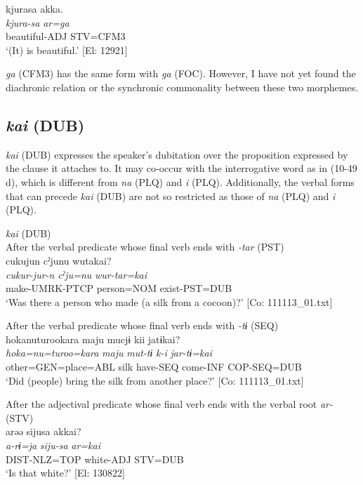 \begin{xlist}
  \ex  %
      \glll    kjurasa  akka.\\
      \textit{kjura-sa}  \textit{ar=ga}\\
      beautiful-ADJ  STV=CFM3\\
      \glt       ‘(It) is beautiful.’ [El: 12921]
    \z
\z

  \textit{ga} (CFM3) has the same form with \textit{ga} (FOC). However, I have not yet found the diachronic relation or the synchronic commonality between these two morphemes.

\subsection{\textit{kai} (DUB)}\label{sec:10.3.6}

\textit{kai} (DUB) expresses the speaker’s dubitation over the proposition expressed by the clause it attaches to. It may co-occur with the interrogative word as in (10-49 d), which is different from \textit{na} (PLQ) and \textit{i} (PLQ). Additionally, the verbal forms that can precede \textit{kai} (DUB) are not so restricted as those of \textit{na} (PLQ) and \textit{i} (PLQ).

\ea\label{ex:10.49}   \textit{kai} (DUB)\\
  \ea After the verbal predicate whose final verb ends with \textit{{}-tar} (PST)\\
      \glll    cukujun  cˀjunu  wutakai?\\
    \textit{cukur-jur-n}  \textit{cˀju=nu}  \textit{wur-tar=kai}\\
    make-UMRK-PTCP  person=NOM  exist-PST=DUB\\
\glt     ‘Was there a person who made (a silk from a cocoon)?’  [Co: 111113\_01.txt]

  \ex After the verbal predicate whose final verb ends with \textit{{}-tɨ} (SEQ)\\
      \glll    {\textbar}hoka{\textbar}nuturookara  maju  mucjɨ  kii  jatɨkai?\\
    \textit{hoka=nu=turoo=kara}  \textit{maju}  \textit{mut-tɨ}  \textit{k-i}  \textit{jar-tɨ=kai}\\
    other=GEN=place=ABL  silk  have-SEQ  come-INF  COP-SEQ=DUB\\
\glt     ‘Did (people) bring the silk from another place?’  [Co: 111113\_01.txt]

  \ex After the adjectival predicate whose final verb ends with the verbal root \textit{ar-} (STV)\\
      \glll    arəə  sijusa  akkai?\\
    \textit{a-rɨ=ja}  \textit{siju-sa}  \textit{ar=kai}\\
    DIST-NLZ=TOP  white-ADJ  STV=DUB\\
    \glt     ‘Is that white?’ [El: 130822]


\end{xlist}
